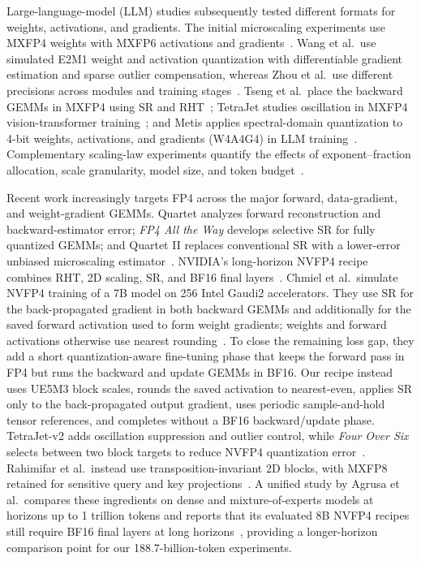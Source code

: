 \documentclass[11pt]{article}
\newcommand{\ue}{UE5M3}
\newcommand{\nv}{NVFP4}
\begin{document}
Large-language-model (LLM) studies subsequently tested different formats for
weights, activations, and gradients.  The initial
microscaling experiments use MXFP4 weights with MXFP6 activations and
gradients~\citep{rouhani2023microscaling}.  Wang et al.\ use simulated E2M1
weight and activation quantization with differentiable gradient estimation and
sparse outlier compensation, whereas Zhou et al.\ use different precisions
across modules and training stages~\citep{wang2025optimizing,zhou2025exploring}.  Tseng et al.\ place the backward
GEMMs in MXFP4 using SR and RHT~\citep{tseng2025mxfp4}; TetraJet studies
oscillation in MXFP4 vision-transformer training~\citep{chen2025tetrajet}; and
Metis applies spectral-domain quantization to 4-bit weights, activations, and
gradients (W4A4G4) in LLM
training~\citep{cao2026metis}.  Complementary scaling-law experiments quantify
the effects of exponent--fraction allocation, scale granularity, model size,
and token budget~\citep{sun2025scaling}.

Recent work increasingly targets FP4 across the major forward, data-gradient,
and weight-gradient GEMMs.  Quartet analyzes forward reconstruction and
backward-estimator error; \emph{FP4 All the Way} develops selective SR for
fully quantized GEMMs; and Quartet II replaces conventional SR with a
lower-error unbiased microscaling estimator~\citep{castro2025quartet,chmiel2025fp4all,panferov2026quartet2}.  NVIDIA's
long-horizon \nv{} recipe combines RHT, 2D scaling, SR, and BF16 final
layers~\citep{nvidia2025nvfp4}.  Chmiel et al.\ simulate \nv{} training of a 7B
model on 256 Intel Gaudi2 accelerators.  They use SR for the back-propagated
gradient in both backward GEMMs and additionally for the saved forward
activation used to form weight gradients; weights and forward activations
otherwise use nearest rounding~\citep{chmiel2025fp4all}.  To close the remaining loss gap,
they add a short quantization-aware fine-tuning phase that keeps the forward
pass in FP4 but runs the backward and update GEMMs in BF16.  Our recipe instead
uses \ue{} block scales, rounds the saved activation to nearest-even, applies
SR only to the back-propagated output gradient, uses periodic sample-and-hold
tensor references, and completes without a BF16 backward/update phase.
TetraJet-v2 adds oscillation suppression and
outlier control, while \emph{Four Over Six} selects between two block targets to
reduce NVFP4 quantization error~\citep{chen2026tetrajetv2,cook2025fouroversix}.  Rahimifar et al.\ instead use
transposition-invariant 2D blocks, with MXFP8 retained for sensitive query and
key projections~\citep{rahimifar2026transposition}.  A unified study by Agrusa
et al.\ compares these ingredients on dense and mixture-of-experts models at
horizons up to 1 trillion tokens and reports that its evaluated 8B \nv{}
recipes still require BF16 final layers at long
horizons~\citep{agrusa2026whatmatters}, providing a longer-horizon comparison
point for our 188.7-billion-token experiments.
\end{document}
